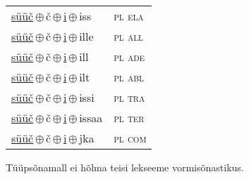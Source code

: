 \begin{minipage}{\textwidth}
\begin{sideways}
\begin{tabular}{l l}
\underline{süüč}\,$\oplus$\,č\,$\oplus$\,\underline{i}\,$\oplus$\,iss & \textsc{ pl ela } \\
\underline{süüč}\,$\oplus$\,č\,$\oplus$\,\underline{i}\,$\oplus$\,ille & \textsc{ pl all } \\
\underline{süüč}\,$\oplus$\,č\,$\oplus$\,\underline{i}\,$\oplus$\,ill & \textsc{ pl ade } \\
\underline{süüč}\,$\oplus$\,č\,$\oplus$\,\underline{i}\,$\oplus$\,ilt & \textsc{ pl abl } \\
\underline{süüč}\,$\oplus$\,č\,$\oplus$\,\underline{i}\,$\oplus$\,issi & \textsc{ pl tra } \\
\underline{süüč}\,$\oplus$\,č\,$\oplus$\,\underline{i}\,$\oplus$\,issaa & \textsc{ pl ter } \\
\underline{süüč}\,$\oplus$\,č\,$\oplus$\,\underline{i}\,$\oplus$\,jka & \textsc{ pl com } \\
\end{tabular}
\end{sideways}
\label{tab:tüüpsõnamall-süüčči}

\end{minipage}

 
\vspace{1em}
\noindent Tüüpsõnamall  ei hõlma teisi lekseeme vormi\-sõnastikus.
